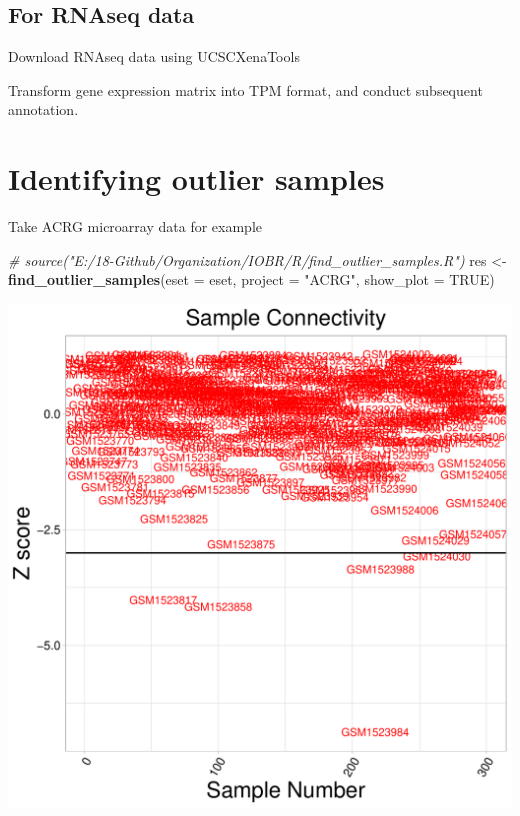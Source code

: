 \documentclass[
  12pt,
]{book}
\newenvironment{Shaded}{\begin{snugshade}}{\end{snugshade}}
\newcommand{\AttributeTok}[1]{\textcolor[rgb]{0.13,0.29,0.53}{#1}}
\newcommand{\CommentTok}[1]{\textcolor[rgb]{0.56,0.35,0.01}{\textit{#1}}}
\newcommand{\ConstantTok}[1]{\textcolor[rgb]{0.56,0.35,0.01}{#1}}
\newcommand{\FunctionTok}[1]{\textcolor[rgb]{0.13,0.29,0.53}{\textbf{#1}}}
\newcommand{\NormalTok}[1]{#1}
\newcommand{\OtherTok}[1]{\textcolor[rgb]{0.56,0.35,0.01}{#1}}
\newcommand{\StringTok}[1]{\textcolor[rgb]{0.31,0.60,0.02}{#1}}
\theoremstyle{definition}
\theoremstyle{definition}
\theoremstyle{definition}
\theoremstyle{definition}
\theoremstyle{remark}
\begin{document}
\hypertarget{for-rnaseq-data}{%
\subsection{For RNAseq data}\label{for-rnaseq-data}}

Download RNAseq data using UCSCXenaTools

Transform gene expression matrix into TPM format, and conduct subsequent annotation.

\hypertarget{identifying-outlier-samples}{%
\section{Identifying outlier samples}\label{identifying-outlier-samples}}

Take ACRG microarray data for example

\begin{Shaded}
\begin{Highlighting}[]
\CommentTok{\# source("E:/18{-}Github/Organization/IOBR/R/find\_outlier\_samples.R")}
\NormalTok{res }\OtherTok{\textless{}{-}} \FunctionTok{find\_outlier\_samples}\NormalTok{(}\AttributeTok{eset =}\NormalTok{ eset, }\AttributeTok{project =} \StringTok{"ACRG"}\NormalTok{, }\AttributeTok{show\_plot =} \ConstantTok{TRUE}\NormalTok{)}
\end{Highlighting}
\end{Shaded}

\begin{center}\includegraphics{_main_files/figure-latex/unnamed-chunk-13-1} \end{center}
\end{document}
